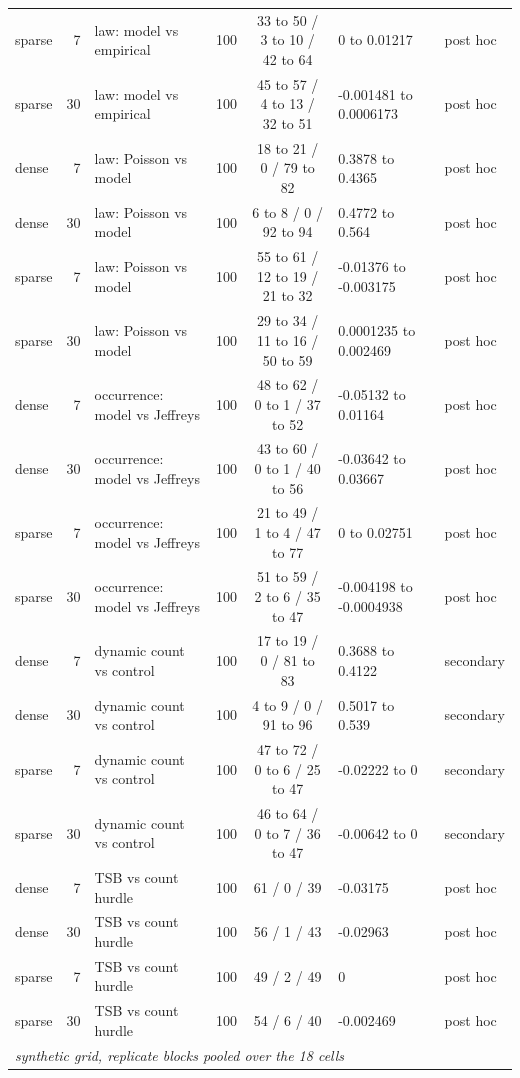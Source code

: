\begin{table}[p]
\begin{tabular}{lrllcll}
sparse & 7 & law: model vs empirical & 100 & 33 to 50 / 3 to 10 / 42 to 64 & 0 to 0.01217 & post hoc \\
sparse & 30 & law: model vs empirical & 100 & 45 to 57 / 4 to 13 / 32 to 51 & -0.001481 to 0.0006173 & post hoc \\
dense & 7 & law: Poisson vs model & 100 & 18 to 21 / 0 / 79 to 82 & 0.3878 to 0.4365 & post hoc \\
dense & 30 & law: Poisson vs model & 100 & 6 to 8 / 0 / 92 to 94 & 0.4772 to 0.564 & post hoc \\
sparse & 7 & law: Poisson vs model & 100 & 55 to 61 / 12 to 19 / 21 to 32 & -0.01376 to -0.003175 & post hoc \\
sparse & 30 & law: Poisson vs model & 100 & 29 to 34 / 11 to 16 / 50 to 59 & 0.0001235 to 0.002469 & post hoc \\
dense & 7 & occurrence: model vs Jeffreys & 100 & 48 to 62 / 0 to 1 / 37 to 52 & -0.05132 to 0.01164 & post hoc \\
dense & 30 & occurrence: model vs Jeffreys & 100 & 43 to 60 / 0 to 1 / 40 to 56 & -0.03642 to 0.03667 & post hoc \\
sparse & 7 & occurrence: model vs Jeffreys & 100 & 21 to 49 / 1 to 4 / 47 to 77 & 0 to 0.02751 & post hoc \\
sparse & 30 & occurrence: model vs Jeffreys & 100 & 51 to 59 / 2 to 6 / 35 to 47 & -0.004198 to -0.0004938 & post hoc \\
dense & 7 & dynamic count vs control & 100 & 17 to 19 / 0 / 81 to 83 & 0.3688 to 0.4122 & secondary \\
dense & 30 & dynamic count vs control & 100 & 4 to 9 / 0 / 91 to 96 & 0.5017 to 0.539 & secondary \\
sparse & 7 & dynamic count vs control & 100 & 47 to 72 / 0 to 6 / 25 to 47 & -0.02222 to 0 & secondary \\
sparse & 30 & dynamic count vs control & 100 & 46 to 64 / 0 to 7 / 36 to 47 & -0.00642 to 0 & secondary \\
dense & 7 & TSB vs count hurdle & 100 & 61 / 0 / 39 & -0.03175 & post hoc \\
dense & 30 & TSB vs count hurdle & 100 & 56 / 1 / 43 & -0.02963 & post hoc \\
sparse & 7 & TSB vs count hurdle & 100 & 49 / 2 / 49 & 0 & post hoc \\
sparse & 30 & TSB vs count hurdle & 100 & 54 / 6 / 40 & -0.002469 & post hoc \\
\midrule
\multicolumn{7}{l}{\emph{synthetic grid, replicate blocks pooled over the 18 cells}} \\

\end{tabular}
\end{table}
